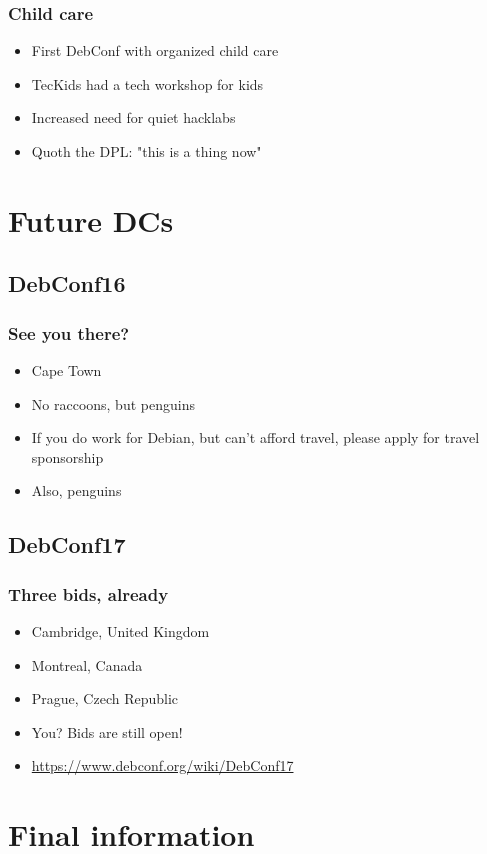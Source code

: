 \documentclass[t]{beamer}
\begin{document}
\begin{frame}
	\frametitle{Child care}
	\begin{itemize}
		\item First DebConf with organized child care
		\item TecKids had a tech workshop for kids
		\item Increased need for quiet hacklabs
		\item Quoth the DPL: "this is a thing now"
	\end{itemize}
\end{frame}

\section{Future DCs}

\subsection{DebConf16}

\begin{frame}
	\frametitle{See you there?}
	\begin{itemize}
		\item Cape Town
		\item No raccoons, but penguins
		\item If you do work for Debian, but can't afford travel, please apply for travel sponsorship
		\item Also, penguins
	\end{itemize}
\end{frame}

\subsection{DebConf17}

\begin{frame}
	\frametitle{Three bids, already}
	\begin{itemize}
		\item Cambridge, United Kingdom
		\item Montreal, Canada
		\item Prague, Czech Republic
		\item You? Bids are still open!
		\item \url{https://www.debconf.org/wiki/DebConf17}
	\end{itemize}
\end{frame}


\section{Final information}
\end{document}
